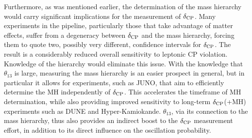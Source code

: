 \documentclass[../thesis.tex]{subfiles}
\begin{document}
Furthermore, as was mentioned earlier, the determination of the mass hierarchy would carry significant implications for the measurement of $\delta_\text{CP}$. Many experiments in the pipeline, particularly those that take advantage of matter effects, suffer from a degeneracy between $\delta_\text{CP}$ and the mass hierarchy, forcing them to quote two, possibly very different, confidence intervals for $\delta_\text{CP}$. The result is a considerably reduced overall sensitivity to leptonic CP violation. Knowledge of the hierarchy would eliminate this issue. With the knowledge that $\theta_{13}$ is large, measuring the mass hierarchy is an easier prospect in general, but in particular it allows for experiments, such as JUNO, that aim to efficiently determine the MH independently of $\delta_\text{CP}$. This accelerates the timeframe of MH determination, while also providing improved sensitivity to long-term $\delta_\text{CP}$(+MH) experiments such as DUNE and Hyper-Kamiokande. $\theta_{13}$, via its connection to the mass hierarchy, thus also provides an indirect boost to the $\delta_\text{CP}$ measurement effort, in addition to its direct influence on the oscillation probability.
\end{document}
